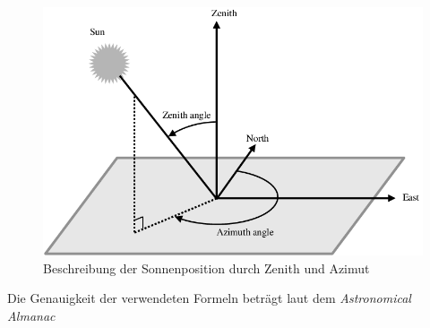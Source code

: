 \begin{figure}[hbtp]
  \centering
  \includegraphics[width=\textwidth]{./img/Representation-of-azimuth-and-zenith-angles.png}
  \caption{Beschreibung der Sonnenposition durch Zenith und Azimut~\cite{Nou2016}}\label{fig:zen_azi}
\end{figure}

Die Genauigkeit der verwendeten Formeln beträgt laut dem \emph{Astronomical Almanac} 



